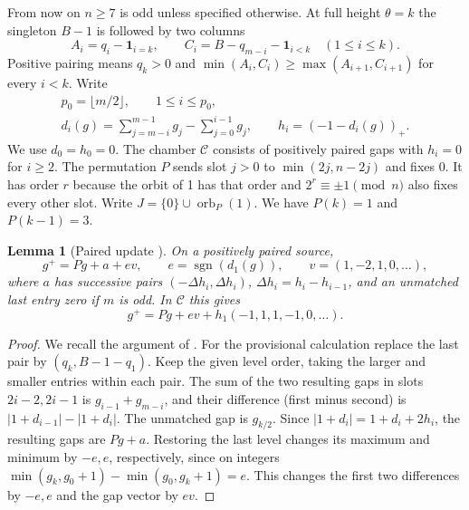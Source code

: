 \documentclass[11pt]{amsart}
\newtheorem{lemma}[theorem]{Lemma}
\theoremstyle{definition}
\DeclareMathOperator{\sgn}{sgn}
\newcommand{\one}{\mathbf 1}
\newcommand{\C}{\mathcal C}
\begin{document}
From now on \(n\ge7\) is odd unless specified otherwise. At full
height \(\theta=k\) the singleton \(B-1\) is followed by two columns
\[
 A_i=q_i-\one_{i=k},\qquad C_i=B-q_{m-i}-\one_{i<k}\quad(1\le i\le k).
\]
Positive pairing means \(q_k>0\) and
\(\min(A_i,C_i)\ge\max(A_{i+1},C_{i+1})\) for every \(i<k\).
Write
\[
 \begin{gathered}
 p_0=\lfloor m/2\rfloor,\qquad 1\le i\le p_0,\\
 d_i(g)=\sum_{j=m-i}^{m-1}g_j-\sum_{j=0}^{i-1}g_j,\qquad
 h_i=(-1-d_i(g))_+ .
 \end{gathered}
\]
We use \(d_0=h_0=0\). The chamber \(\C\) consists of positively
paired gaps with \(h_i=0\) for \(i\ge2\).
The permutation \(P\) sends slot \(j>0\) to \(\min(2j,n-2j)\) and
fixes 0. It has order \(r\) because the orbit of 1 has that order
and \(2^r\equiv\pm1\pmod n\) also fixes every other slot. Write
\(J=\{0\}\cup\operatorname{orb}_P(1)\). We have \(P(k)=1\) and
\(P(k-1)=3\).

\begin{lemma}[Paired update {\cite[Lemma~4]{G10}}]\label{lem:update}
On a positively paired source,
\[
 g^+=Pg+a+ev,\qquad e=\sgn(d_1(g)),\qquad v=(1,-2,1,0,\ldots),
\]
where \(a\) has successive pairs \((-\Delta h_i,\Delta h_i)\),
\(\Delta h_i=h_i-h_{i-1}\), and an unmatched last entry zero if \(m\) is odd.
In \(\C\) this gives
\begin{equation}\label{eq:Cupdate}
 g^+=Pg+ev+h_1(-1,1,1,-1,0,\ldots).
\end{equation}
\end{lemma}

\begin{proof}
We recall the argument of \cite[Section~2]{G10}.
For the provisional calculation replace the last pair by
\((q_k,B-1-q_1)\). Keep the given level order, taking the larger and
smaller entries within each pair.
The sum of the two resulting gaps in slots \(2i-2,2i-1\)
is \(g_{i-1}+g_{m-i}\), and their difference (first minus second)
is \(|1+d_{i-1}|-|1+d_i|\). The unmatched gap is \(g_{k/2}\). Since
\(|1+d_i|=1+d_i+2h_i\), the resulting gaps are \(Pg+a\).
Restoring the last level changes its maximum and minimum by
\(-e,e\), respectively, since on integers
\(\min(g_k,g_0+1)-\min(g_0,g_k+1)=e\).
This changes the first two differences by \(-e,e\) and the gap
vector by \(ev\).
\end{proof}
\end{document}
